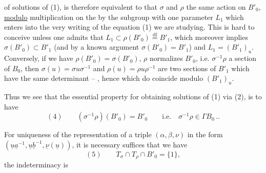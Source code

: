 


of solutions of (1), is therefore equivalent to that
  $\sigma$ and $\rho$
 the same action
on $B'_0$, \uline{modulo} multiplication on the  by
 the subgroup 
 with one parameter $L_1$ which
enters into the very writing of the equation (1) we are studying.
This is hard to conceive unless one admits that
$L_1\subset\rho(B'_0)\overset{\mathrm{df}}=B'_1$, which moreover implies
$\sigma(B'_0)\subset B'_1$ (and by a known argument $\sigma(B'_0)=B'_1$)
and $L_1=(B'_1)_u$. Conversely, if we have
$\rho(B'_0)=\sigma(B'_0)$, 
\deleted{$\unsure{\rho(-)}$}$\rho$ normalizes $B'_0$,
 i.e. $\sigma^{-1}\rho$ a section of $B_0$, then
$\sigma(u)=\sigma u\sigma^{-1}$ and $\rho(u)=\rho u\rho^{-1}$ are two sections
of $B'_1$ which have the same determinant -- ,
hence which do coincide modulo $(B'_1)_u$.

Thus we see that the essential property for obtaining solutions of (1) via (2),
is to have
\[
(4)\qquad (\sigma^{-1}\rho)(B'_0)=B'_0\qquad\text{i.e.}\quad
\sigma^{-1}\rho\in\Gamma B_0\, ..
\]

For uniqueness of the representation of a triple $(\alpha,\beta,\nu)$ in the form
$(\underline u\underline a^{-1},\underline u\underline b^{-1},\underline\nu(\underline u))$,
it is necessary   suffices that we have
\[
(5)\qquad T_\sigma\cap T_\rho\cap B'_0=\{1\},
\]
the indeterminacy is

